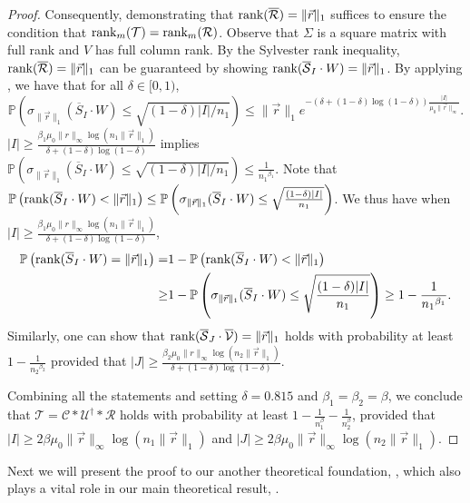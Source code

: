 \documentclass[twoside,12pt]{article}
\def\rank{\textnormal{rank}}
\def\X{\mathcal{T}}
\def\mcR{\mathcal{R}}
\def\mcC{\mathcal{C}}
\def\rank{\textnormal{rank}}
\def\X{\mathcal{T}}
\def\mcR{\mathcal{R}}
\def\mcC{\mathcal{C}}
\begin{document}
\begin{proof}
Consequently, demonstrating that $\rank(\overline{\mcR}) = \|\vec{r}\|_{1}$ suffices to ensure the condition that $\rank_m(\X) = \rank_m(\mcR)$. Observe that $\Sigma$ is a square matrix with full rank and $V$ has full column rank. By the Sylvester rank inequality,   $\rank(\overline{\mcR})=\|\vec{r}\|_1$ can be guaranteed by showing $\rank(\overline{\mathcal{S}}_I\cdot W)=\|\vec{r}\|_1$. By applying  , we have that for all $\delta\in[0,1)$,
\[
\mathbb{P}\left(\sigma_{\|\vec{r}\|_{1}}(\overline{S}_{I}\cdot W) \leq \sqrt{(1-\delta)|I|/{n_1}}\right) \leq 
\|\vec{r}\|_1e^{-(\delta+(1-\delta)\log(1-\delta))\frac{|I|}{\mu_0\|\vec{r}\|_{\infty}}}.
\]
 $|I| \geq \frac{\beta_1\mu_0 \|r\|_{\infty} \log \left(n_1\|\vec{r}\|_{1}\right)}{\delta+(1-\delta)\log(1-\delta)}$ implies
$\mathbb{P}\left(\sigma_{\|\vec{r}\|_{1}}(\overline{S}_{I}\cdot W) \leq \sqrt{ {(1-\delta)|I|}/{{n_1}}}\right) \leq  \frac{1}{{n_1}^{\beta_1}}$. Note that $\mathbb{P}\left(\rank(\overline{S}_{I}\cdot W)< \|\vec{r}\|_{1}\right) \leq \mathbb{P}\left(\sigma_{\|\vec{r}\|_{1}}(\overline{S}_{I}\cdot W) \leq \sqrt{\frac{(1-\delta)|I|}{{n_1}}}\right)$.
We thus have when $|I| \geq \frac{\beta_1\mu_0 \|r\|_{\infty} \log \left(n_1\|\vec{r}\|_{1}\right)}{\delta+(1-\delta)\log(1-\delta)}$, 
\begin{align*}
\mathbb{P}\left(\rank(\overline{S}_{I}\cdot W)= \|\vec{r}\|_{1}\right)
= & 1 -\mathbb{P}\left(\rank(\overline{S}_{I}\cdot W)< \|\vec{r}\|_{1}\right) \\
\geq &1- \mathbb{P}\left(\sigma_{\|\vec{r}\|_{1}}(\overline{S}_{I}\cdot W) \leq \sqrt{\frac{(1-\delta)|I|}{{n_1}}}\right) 
\geq 1- \frac{1}{{n_1}^{\beta_1}}.
\end{align*}
Similarly, one can show that $\rank(\overline{\mathcal{S}}_{J}\cdot \overline{\mathcal{V}})=\|\vec{r}\|_1$ holds with probability at least $1-\frac{1}{{n_2}^{\beta_2}}$ provided that $|J|\geq  \frac{\beta_{2}\mu_0 \|r\|_{\infty} \log \left(n_2\|\vec{r}\|_{1}\right)}{\delta+(1-\delta)\log(1-\delta)}$. 

Combining all the statements and setting $\delta = 0.815$ and $\beta_1 = \beta_2=\beta$, we  conclude that $\mathcal{T}=\mcC*\mathcal{U}^\dagger*\mcR$ holds with   probability  at least $1-\frac{1}{n_{1}^{\beta}}-\frac{1}{n_{2}^{\beta}}$, provided that $|I|\geq 2\beta \mu_0 \|\vec{r}\|_{\infty} \log \left(n_1\|\vec{r}\|_{1}\right)$ and  $|J|\geq 2\beta \mu_0 \|\vec{r}\|_{\infty} \log \left(n_2\|\vec{r}\|_{1}\right)$. 
\end{proof}
Next we will present the proof to our another theoretical foundation, , which also plays a vital role in our main theoretical result, .
\end{document}
